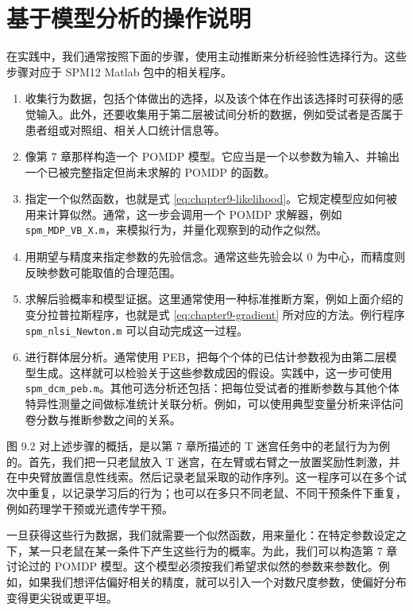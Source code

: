 \section{基于模型分析的操作说明}

在实践中，我们通常按照下面的步骤，使用主动推断来分析经验性选择行为。这些步骤对应于 SPM12 Matlab 包中的相关程序。

\begin{enumerate}
\item 收集行为数据，包括个体做出的选择，以及该个体在作出该选择时可获得的感觉输入。此外，还要收集用于第二层被试间分析的数据，例如受试者是否属于患者组或对照组、相关人口统计信息等。
\item 像第 7 章那样构造一个 POMDP 模型。它应当是一个以参数为输入、并输出一个已被完整指定但尚未求解的 POMDP 的函数。
\item 指定一个似然函数，也就是式 \eqref{eq:chapter9-likelihood}。它规定模型应如何被用来计算似然。通常，这一步会调用一个 POMDP 求解器，例如 \texttt{spm\_MDP\_VB\_X.m}，来模拟行为，并量化观察到的动作之似然。
\item 用期望与精度来指定参数的先验信念。通常这些先验会以 $0$ 为中心，而精度则反映参数可能取值的合理范围。
\item 求解后验概率和模型证据。这里通常使用一种标准推断方案，例如上面介绍的变分拉普拉斯程序，也就是式 \eqref{eq:chapter9-gradient} 所对应的方法。例行程序 \texttt{spm\_nlsi\_Newton.m} 可以自动完成这一过程。
\item 进行群体层分析。通常使用 PEB，把每个个体的已估计参数视为由第二层模型生成。这样就可以检验关于这些参数成因的假设。实践中，这一步可使用 \texttt{spm\_dcm\_peb.m}。其他可选分析还包括：把每位受试者的推断参数与其他个体特异性测量之间做标准统计关联分析。例如，可以使用典型变量分析来评估问卷分数与推断参数之间的关系。
\end{enumerate}

图 9.2 对上述步骤的概括，是以第 7 章所描述的 T 迷宫任务中的老鼠行为为例的。首先，我们把一只老鼠放入 T 迷宫，在左臂或右臂之一放置奖励性刺激，并在中央臂放置信息性线索。然后记录老鼠采取的动作序列。这一程序可以在多个试次中重复，以记录学习后的行为；也可以在多只不同老鼠、不同干预条件下重复，例如药理学干预或光遗传学干预。

一旦获得这些行为数据，我们就需要一个似然函数，用来量化：在特定参数设定之下，某一只老鼠在某一条件下产生这些行为的概率。为此，我们可以构造第 7 章讨论过的 POMDP 模型。这个模型必须按我们希望求似然的参数来参数化。例如，如果我们想评估偏好相关的精度，就可以引入一个对数尺度参数，使偏好分布变得更尖锐或更平坦。

